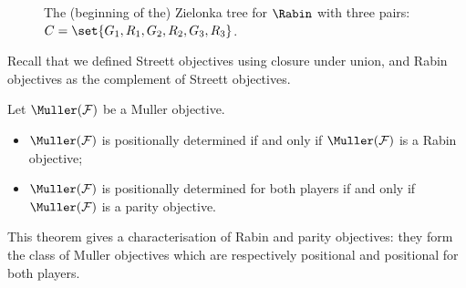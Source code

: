 \begin{figure}
\centering
\caption{The (beginning of the) Zielonka tree for $\Rabin$ with three pairs: 
$C = \set{G_1,R_1,G_2,R_2,G_3,R_3}$.}
\label{2-fig:Zielonka_tree_Rabin}
\end{figure}

Recall that we defined Streett objectives using closure under union, and Rabin objectives as the complement of Streett objectives.

\begin{theorem}
Let $\Muller(\F)$ be a Muller objective.
\begin{itemize}
	\item $\Muller(\F)$ is positionally determined if and only if $\Muller(\F)$ is a Rabin objective;
	\item $\Muller(\F)$ is positionally determined for both players if and only if $\Muller(\F)$ is a parity objective.
\end{itemize}
\end{theorem}
This theorem gives a characterisation of Rabin and parity objectives: they form the class of Muller objectives which are respectively positional and positional for both players.

